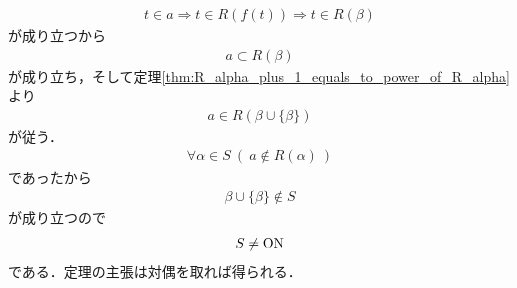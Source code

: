 \begin{prf}
		\begin{align}
			t \in a \Longrightarrow t \in R(f(t)) \Longrightarrow t \in R(\beta)
		\end{align}
		が成り立つから
		\begin{align}
			a \subset R(\beta)
		\end{align}
		が成り立ち，そして定理\ref{thm:R_alpha_plus_1_equals_to_power_of_R_alpha}より
		\begin{align}
			a \in R\left(\beta \cup \{\beta\}\right)
		\end{align}
		が従う．
		\begin{align}
			\forall \alpha \in S\ (\ a \notin R(\alpha)\ )
		\end{align}
		であったから
		\begin{align}
			\beta \cup \{\beta\} \notin S
		\end{align}
		が成り立つので
		\begin{align}
			S \neq \mathrm{ON}
		\end{align}
		である．定理の主張は対偶を取れば得られる．
		\QED
	\end{prf}
	
	\begin{screen}
		\begin{dfn}[集合の階数]
		\end{dfn}
	\end{screen}